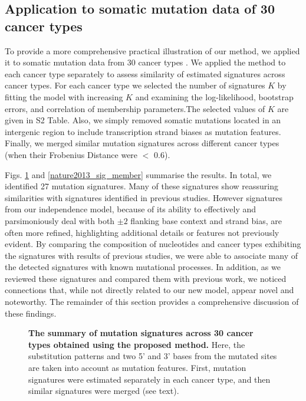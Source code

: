 \documentclass[10pt,letterpaper]{article}
\begin{document}
\subsection*{Application to somatic mutation data of 30 cancer types}
 
To provide a more comprehensive practical illustration of
our method, we applied it to somatic mutation data from 30 cancer types \cite{pmid23945592}.
We applied the method to each cancer type separately to assess similarity of estimated signatures across cancer types.
For each cancer type we selected the number of signatures $K$ by fitting the model with increasing $K$ and examining the log-likelihood, bootstrap errors, and correlation of membership parameters.The selected values of $K$ are given in S2 Table.
Also, we simply removed somatic mutations located in an intergenic region to include transcription strand biases as mutation features.
Finally, we merged similar mutation signatures across different cancer types 
(when their Frobenius Distance were $<$ $0.6$). 



Figs. \ref{nature2013_sig_summary} and \ref{nature2013_sig_member} summarise the results.
In total, we identified 27 mutation signatures.
Many of these signatures show reassuring similarities with
signatures identified in previous studies. However
signatures from our independence model, because of its ability to effectively
and parsimoniously deal with both $\pm2$ flanking
base context and strand bias, are often more refined, highlighting additional details or features not previously evident. By comparing the composition of nucleotides and cancer types exhibiting the signatures with results of previous studies, we were able to associate many of the detected signatures with known mutational processes.
In addition, as we reviewed these signatures
and compared them with previous work, we noticed connections
that, while not directly related to our new model, appear
novel and noteworthy. The remainder of this section
provides a comprehensive discussion of these findings.

\begin{figure}[h]
\centering
\caption{{\bf The summary of mutation signatures across 30 cancer types \cite{pmid23945592} obtained using the proposed method.}
Here, the substitution patterns and two 5' and 3' bases from the mutated sites are taken into account as mutation features.
First, mutation signatures were estimated separately in each cancer type, and then similar signatures were merged (see text).
}
\label{nature2013_sig_summary}
\end{figure}
\end{document}
